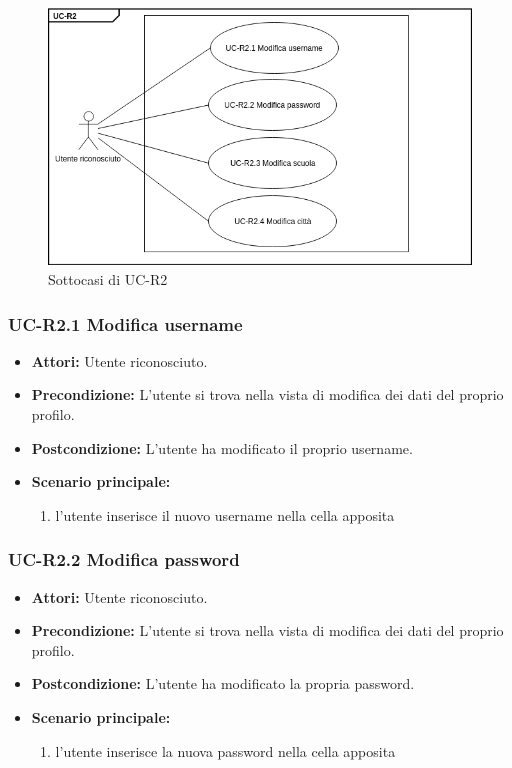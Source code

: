 				\begin{figure}[htbp]
			\centering
			\includegraphics[scale=0.7]{images/UC-R2sub.png}
			\caption{Sottocasi di UC-R2}
		\end{figure}
		
\subsubsection{UC-R2.1 Modifica username}
\begin{itemize}
			\item \textbf{Attori:} Utente riconosciuto.
			\item \textbf{Precondizione:} L'utente si trova nella vista di modifica dei dati del proprio profilo.
			\item \textbf{Postcondizione:} L'utente ha modificato il proprio username.
			\item \textbf{Scenario principale:}
			\begin{enumerate}
				\item l'utente inserisce il nuovo username nella cella apposita
			\end{enumerate}
\end{itemize}

\subsubsection{UC-R2.2 Modifica password}
\begin{itemize}
			\item \textbf{Attori:} Utente riconosciuto.
			\item \textbf{Precondizione:} L'utente si trova nella vista di modifica dei dati del proprio profilo.
			\item \textbf{Postcondizione:} L'utente ha modificato la propria password.
			\item \textbf{Scenario principale:}
			\begin{enumerate}
				\item l'utente inserisce la nuova password nella cella apposita
			\end{enumerate}
\end{itemize}

